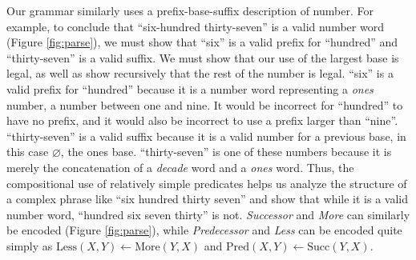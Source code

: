 \documentclass[10pt,letterpaper]{article}
\begin{document}
Our grammar similarly uses a prefix-base-suffix description of number.
For example, to conclude that ``six-hundred thirty-seven'' is a valid
number word (Figure \ref{fig:parse}), we must show that ``six'' is a
valid prefix for ``hundred'' and ``thirty-seven'' is a valid suffix.
We must show that our use of the largest base is legal, as well as
show recursively that the rest of the number is legal. ``six'' is a
valid prefix for ``hundred'' because it is a number word representing
a \emph{ones} number, a number between one and nine. It would be
incorrect for ``hundred'' to have no prefix, and it would also be
incorrect to use a prefix larger than ``nine''. ``thirty-seven'' is a
valid suffix because it is a valid number for a previous base, in this
case $\varnothing$, the ones base. ``thirty-seven'' is one of these
numbers because it is merely the concatenation of a \emph{decade} word
and a \emph{ones} word. Thus, the compositional use of relatively
simple predicates helps us analyze the structure of a complex phrase
like ``six hundred thirty seven'' and show that while it is a valid
number word, ``hundred six seven thirty'' is not. \emph{Successor} and
\emph{More} can similarly be encoded (Figure \ref{fig:parse}), while
\emph{Predecessor} and \emph{Less} can be encoded quite simply as
$\text{Less}(X,Y) \leftarrow \text{More}(Y,X)$ and $\text{Pred}(X,Y)
\leftarrow \text{Succ}(Y,X)$.
\end{document}
